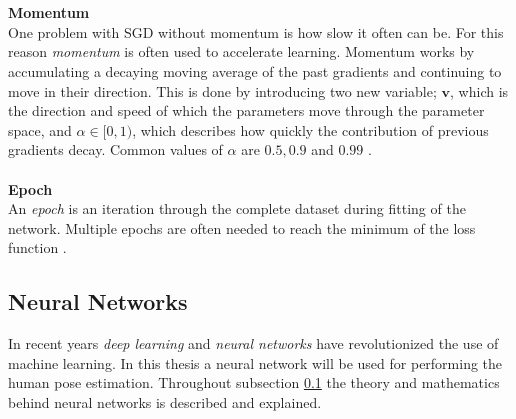 \documentclass[./main.tex]{subfiles}
\begin{document}
\\
\\
\textbf{Momentum} \\
One problem with SGD without momentum is how slow it often can be. For this reason \textit{momentum} is often used to accelerate learning. Momentum works by accumulating a decaying moving average of the past gradients and continuing to move in their direction. This is done by introducing two new variable; $\bm{v}$, which is the direction and speed of which the parameters move through the parameter space, and $\alpha \in [0, 1)$, which describes how quickly the contribution of previous gradients decay. Common values of $\alpha$ are $0.5, 0.9$ and $0.99$ \cite{DeepLearning}. 
\\
\\
\textbf{Epoch} \\
An \textit{epoch} is an iteration through the complete dataset during fitting of the network. Multiple epochs are often needed to reach the minimum of the loss function \cite{d2l}.

\subsection{Neural Networks} \label{subsec:NeuralNetworks}
In recent years \textit{deep learning} and \textit{neural networks} have revolutionized the use of machine learning. In this thesis a neural network will be used for performing the human pose estimation. Throughout subsection \ref{subsec:NeuralNetworks} the theory and mathematics behind neural networks is described and explained.
\end{document}
